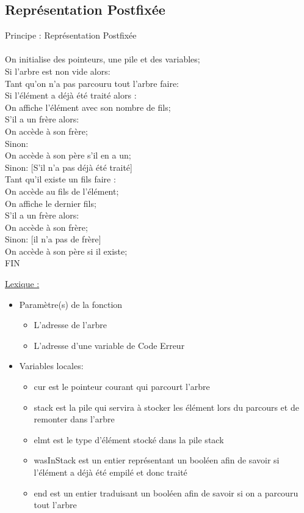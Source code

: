 \documentclass[a4paper]{article}
\newcommand\tab[1][1cm]{\hspace*{#1}}
\begin{document}
\pagebreak

\subsection{Représentation Postfixée}
\begin{algorithm}
Principe : Représentation Postfixée
\\
\\
\tab On initialise des pointeurs, une pile et des variables;
\\
\tab Si l'arbre est non vide alors:
\\
\tab \tab Tant qu'on n'a pas parcouru tout l'arbre faire:
\\
\tab \tab \tab Si l'élément a déjà été traité alors :
\\
\tab \tab \tab \tab On affiche l'élément avec son nombre de fils;
\\
\tab \tab \tab \tab S'il a un frère alors:
\\
\tab \tab \tab \tab \tab On accède à son frère;
\\
\tab \tab \tab \tab Sinon: 
\\
\tab \tab \tab \tab \tab On accède à son père s'il en a un;
\\
\tab \tab \tab Sinon: [S'il n'a pas déjà été traité]
\\
\tab \tab \tab \tab Tant qu'il existe un fils faire :
\\
\tab \tab \tab \tab \tab On accède au fils de l'élément;
\\
\tab \tab \tab \tab On affiche le dernier fils;
\\
\tab \tab \tab \tab S'il a un frère alors:
\\
\tab \tab \tab \tab \tab On accède à son frère;
\\
\tab \tab \tab \tab Sinon: [il n'a pas de frère]
\\
\tab \tab \tab \tab \tab On accède à son père si il existe;
\\
FIN
\end{algorithm}
\underline{Lexique :}
\begin{itemize}
\item Paramètre(s) de la fonction  
\begin{itemize}
\item L'adresse de l'arbre
\item L'adresse d'une variable de Code Erreur
\end{itemize}
\item Variables locales:
\begin{itemize}
\item cur est le pointeur courant qui parcourt l'arbre
\item stack est la pile qui servira à stocker les élément lors du parcours et de remonter dans l'arbre
\item elmt  est le type d'élément stocké dans la pile stack 
\item wasInStack est un entier représentant un booléen afin de savoir si l'élément a déjà été empilé et donc traité
\item end est un entier traduisant un booléen afin de savoir si on a parcouru tout l'arbre 
\end{itemize}
\end{itemize}
\end{document}
